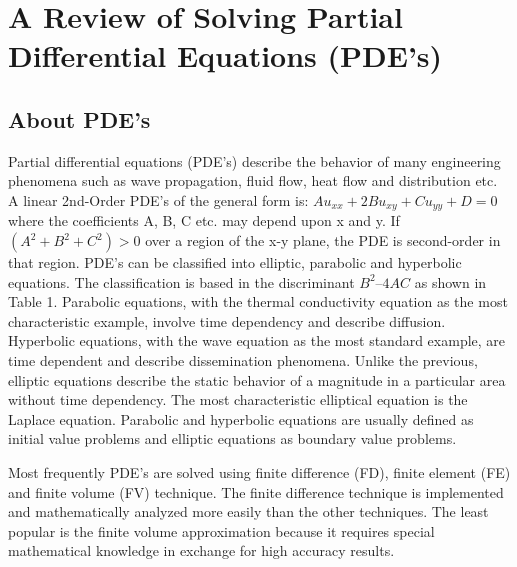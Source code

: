 \chapter{A Review of Solving Partial Differential Equations (PDE's)}



\section{About PDE's}

Partial differential equations (PDE's) describe the behavior of many engineering phenomena such as wave propagation, fluid flow, heat flow and distribution etc. A linear 2nd-Order PDE's of the general form is:
$Au_{xx} + 2Bu_{xy} + Cu_{yy} + D = 0$
where the coefficients A, B, C etc.  may depend upon x and y. 
If $(A^2+ B^2+C^2) >0$ over a region of the x-y plane, the PDE is second-order in that region. PDE's can be classified into elliptic, parabolic and hyperbolic equations. The classification is based in the discriminant $B^2 – 4AC$ as shown in Table 1. Parabolic equations, with the thermal conductivity equation as the most characteristic example, involve time dependency and describe diffusion. Hyperbolic equations, with the wave equation as the most standard example, are time dependent
and describe dissemination phenomena. Unlike the previous, elliptic equations describe the static behavior of a magnitude in a particular area without time dependency. The most characteristic elliptical equation is the Laplace equation. Parabolic and hyperbolic equations are usually defined as initial value problems and elliptic equations as boundary value problems.



Most frequently PDE's are solved using finite difference (FD), finite element (FE) and finite volume (FV) technique. The finite difference technique is implemented and mathematically analyzed more easily than the other techniques. The least popular is the finite volume approximation because it requires special mathematical knowledge in exchange for high accuracy results.



